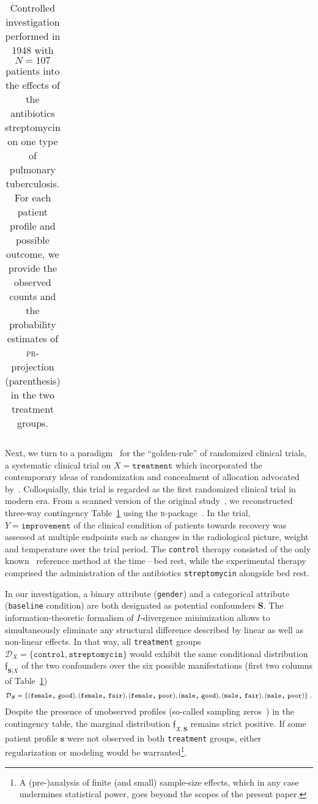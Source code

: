 \documentclass[10pt]{article}
\newcommand{\equ}[1]{\begin{gather} #1 \end{gather}}
\newcommand{\prob}[1]{\mathfrak{#1}}
\begin{document}
\begin{table}[t]
\begin{tabular}{rll|ll}
    \end{tabular}
    \caption{Controlled investigation performed in 1948 with $N=107$ patients into the effects of the antibiotics streptomycin on one
type of pulmonary tuberculosis. For each patient profile and possible outcome, we provide the observed counts and  the probability estimates of \textsc{pr}-projection (parenthesis) in the two treatment groups.}
    \label{tb:Clinical1948}
\end{table}

Next, we turn to a paradigm~\cite{Doll1217} for the ``golden-rule'' of randomized clinical trials, a systematic clinical trial 
on $X=\texttt{treatment}$ 
which incorporated the contemporary ideas of randomization and  concealment of allocation advocated by~\cite{Hill1043}. Colloquially, this trial is regarded as the first randomized clinical trial in modern era. 
From a scanned version of the original study~\cite{original1948},
we reconstructed three-way contingency Table~\ref{tb:Clinical1948} using the \textsc{r}-package~\cite{medicaldata}.
In the trial, 
$Y=\texttt{improvement}$ of the clinical condition of patients towards recovery was assessed at multiple endpoints such as changes in the radiological picture, weight and temperature over the trial period. The \texttt{control} therapy consisted of the only known~\cite{doi:10.1177/014107680609901017} reference method at the time --\,bed rest, while the experimental therapy comprised the administration of the antibiotics \texttt{streptomycin} alongside bed rest. %

In our investigation, a binary attribute (\texttt{gender}) and a categorical attribute (\texttt{baseline} condition)  are both designated as potential  confounders $\boldsymbol S$. The  information-theoretic formalism of $I$-divergence minimization allows to simultaneously eliminate  any structural difference described by linear as well as non-linear effects. In that way, all \texttt{treatment} groups $\mathcal D_X=\{\texttt{control},\texttt{streptomycin}\}$ would exhibit the same conditional distribution $\prob f_{\boldsymbol S\vert X}$ of the two confounders over the six possible manifestations (first two columns of Table~\ref{tb:Clinical1948})
\equ{
\label{eq:1948:s-Profiles}
\mathcal D_{\boldsymbol S} = \{ (\texttt{female,\,\,\texttt{good}}), (\texttt{female,\,\,\texttt{fair}}),(\texttt{female,\,\,\texttt{poor}}),(\texttt{male,\,\,\texttt{good}}),(\texttt{male,\,\,\texttt{fair}}), (\texttt{male,\,\,\texttt{poor}}) \}
~.
}
Despite the presence of unobserved profiles (so-called sampling zeros~\cite{bishop2007discrete}) in the contingency table, the marginal distribution $\prob f_{X,\boldsymbol S}$ remains strict positive. If  some patient profile $\boldsymbol s$ were not observed in both \texttt{treatment} groups, either regularization or modeling would be warranted\footnote{A (pre-)analysis of finite (and small) sample-size  effects, which in any case undermines statistical power, goes beyond the scopes of the present paper.}. 
\end{document}

